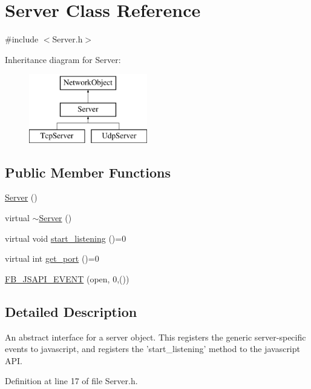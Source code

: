 \hypertarget{classServer}{
\section{Server Class Reference}
\label{classServer}
}


{\ttfamily \#include $<$Server.h$>$}

Inheritance diagram for Server:\begin{figure}[H]
\begin{center}
\leavevmode
\includegraphics[height=3.000000cm]{classServer}
\end{center}
\end{figure}
\subsection*{Public Member Functions}
\begin{DoxyCompactItemize}
\item 
\hyperlink{classServer_ad5ec9462b520e59f7ea831e157ee5e59}{Server} ()
\item 
virtual \hyperlink{classServer_a263268c249dbe6f49627fd50d496a37f}{$\sim$Server} ()
\item 
virtual void \hyperlink{classServer_ab60269481230955b94dc6405162794b0}{start\_\-listening} ()=0
\item 
virtual int \hyperlink{classServer_abd497ca7e7dc29f8ea4c6ce204839a6d}{get\_\-port} ()=0
\item 
\hyperlink{classServer_a1f501aef583a26270ba174202c7f24e5}{FB\_\-JSAPI\_\-EVENT} (open, 0,())
\end{DoxyCompactItemize}


\subsection{Detailed Description}
An abstract interface for a server object. This registers the generic server-\/specific events to javascript, and registers the 'start\_\-listening' method to the javascript API. 

Definition at line 17 of file Server.h.



